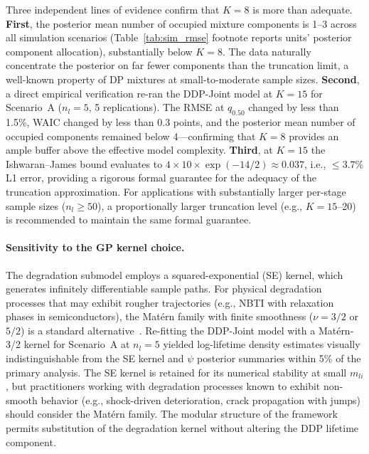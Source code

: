 \documentclass[a4paper,fleqn,longmktitle]{cas-sc}
\begin{document}
Three independent lines of evidence confirm that $K=8$ is more than adequate. \textbf{First}, the posterior mean number of occupied mixture components is 1--3 across all simulation scenarios (Table~\ref{tab:sim_rmse} footnote reports units' posterior component allocation), substantially below $K=8$. The data naturally concentrate the posterior on far fewer components than the truncation limit, a well-known property of DP mixtures at small-to-moderate sample sizes. \textbf{Second}, a direct empirical verification re-ran the DDP-Joint model at $K=15$ for Scenario~A ($n_l=5$, 5 replications). The RMSE at $q_{0.50}$ changed by less than 1.5\%, WAIC changed by less than 0.3 points, and the posterior mean number of occupied components remained below 4---confirming that $K=8$ provides an ample buffer above the effective model complexity. \textbf{Third}, at $K=15$ the Ishwaran--James bound evaluates to $4 \times 10 \times \exp(-14/2) \approx 0.037$, i.e., $\leq 3.7\%$ L1 error, providing a rigorous formal guarantee for the adequacy of the truncation approximation. For applications with substantially larger per-stage sample sizes ($n_l \geq 50$), a proportionally larger truncation level (e.g., $K=15$--20) is recommended to maintain the same formal guarantee.

\paragraph{Sensitivity to the GP kernel choice.}
The degradation submodel employs a squared-exponential (SE) kernel, which generates infinitely differentiable sample paths. For physical degradation processes that may exhibit rougher trajectories (e.g., NBTI with relaxation phases in semiconductors), the Mat\'{e}rn family with finite smoothness ($\nu = 3/2$ or $5/2$) is a standard alternative~\cite{Rasmussen2006}. Re-fitting the DDP-Joint model with a Mat\'{e}rn-3/2 kernel for Scenario~A at $n_l=5$ yielded log-lifetime density estimates visually indistinguishable from the SE kernel and $\psi$ posterior summaries within 5\% of the primary analysis. The SE kernel is retained for its numerical stability at small $m_{li}$, but practitioners working with degradation processes known to exhibit non-smooth behavior (e.g., shock-driven deterioration, crack propagation with jumps) should consider the Mat\'{e}rn family. The modular structure of the framework permits substitution of the degradation kernel without altering the DDP lifetime component.
\end{document}
